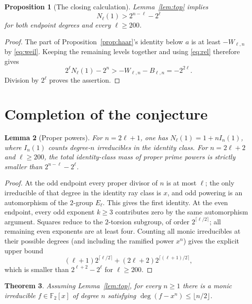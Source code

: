 \documentclass[10pt]{article}
\newtheorem{theorem}{Theorem}
\newtheorem{lemma}[theorem]{Lemma}
\newtheorem{proposition}[theorem]{Proposition}
\newcommand{\F}{\mathbb F}
\begin{document}
\begin{proposition}[The closing calculation]\label{prop:close}
Lemma~\ref{lem:top} implies
\[
 N_\ell(1)>2^{n-\ell}-2^\ell
\]
for both endpoint degrees and every $\ell\geq200$.
\end{proposition}

\begin{proof}
The part of Proposition~\ref{prop:haar}'s identity below $a$ is at least
$-W_{\ell,n}$ by \eqref{eq:weil}.  Keeping the remaining levels together and
using \eqref{eq:rel} therefore gives
\[
 2^\ell N_\ell(1)-2^n
 >-W_{\ell,n}-B_{\ell,n}=-2^{2\ell}.
\]
Division by $2^\ell$ proves the assertion.
\end{proof}

\section{Completion of the conjecture}

\begin{lemma}[Proper powers]\label{lem:powers}
For $n=2\ell+1$, one has
$N_\ell(1)=1+nI_n(1)$, where $I_n(1)$ counts degree-$n$ irreducibles in the
identity class.  For $n=2\ell+2$ and $\ell\geq200$, the total identity-class
mass of proper prime powers is strictly smaller than
$2^{n-\ell}-2^\ell$.
\end{lemma}

\begin{proof}
At the odd endpoint every proper divisor of $n$ is at most $\ell$; the only
irreducible of that degree in the identity ray class is $x$, and odd powering
is an automorphism of the $2$-group $E_\ell$.  This gives the first identity.
At the even endpoint, every odd exponent $k\geq3$ contributes zero by the
same automorphism argument.  Squares reduce to the $2$-torsion subgroup,
of order $2^{\lceil\ell/2\rceil}$; all remaining even exponents are at least
four.  Counting all monic irreducibles at their possible degrees (and
including the ramified power $x^n$) gives the explicit upper bound
\[
 (\ell+1)2^{\lceil\ell/2\rceil}
 +(2\ell+2)2^{\lceil(\ell+1)/2\rceil},
\]
which is smaller than $2^{\ell+2}-2^\ell$ for $\ell\geq200$.
\end{proof}

\begin{theorem}\label{thm:lemire}
Assuming Lemma~\ref{lem:top}, for every $n\geq1$ there is a monic irreducible
$f\in\F_2[x]$ of degree $n$ satisfying
$\deg(f-x^n)\leq\lfloor n/2\rfloor$.
\end{theorem}
\end{document}
